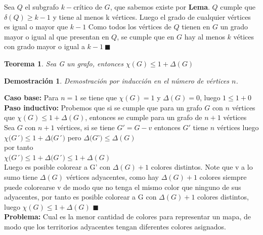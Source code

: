 \documentclass[a4paper,1pt]{report}
\newtheorem*{teo}{Teorema}
\newtheorem*{dem}{Demostración}
\begin{document}
Sea $Q$ el subgrafo $k-$cr\'itico de $G$, que sabemos existe por \textbf{Lema}. $Q$ cumple que $\delta(Q)\geq k-1$ y tiene al menos k vértices. Luego el grado de cualquier vértices es igual o mayor que $k-1$
Como todos los v\'ertices de $Q$ tienen en $G$ un grado mayor o igual al que presentan en $Q$, se cumple que en $G$ hay al menos $k$ v\'etices con grado mayor o igual a $k-1 \ \blacksquare$

\begin{teo}
 Sea G un grafo, entonces $\chi(G)\leq 1 + \Delta(G)$
\end{teo}

\begin{dem}
Demostración por inducción en el número de vértices $n$. 
\end{dem}

\textbf{Caso base:} Para $n=1$ se tiene que $\chi(G)=1$ y $\Delta(G)=0$, luego $1\leq1+0$\\

\textbf{Paso inductivo:} Probemos que si se cumple que para un grafo $G$ con  $n$ v\'ertices que $\chi(G) \leq 1 + \Delta(G)$, entonces se cumple para un grafo de $n+1$ v\'ertices\\

Sea $G$ con $n+1$ vértices, si se tiene $G'=G-v$ entonces $G'$ tiene $n$ vértices luego
$\chi(G$´$)\leq 1 + \Delta(G$´$)$ pero $\Delta(G$'$)\leq \Delta(G)$\\ 
por tanto\\
$\chi(G$´$)\leq 1 + \Delta(G$´$)\leq 1 + \Delta(G) \  $\\

Luego es posible colorear a G' con $\Delta(G)+1$ colores distintos. Note que v a lo sumo tiene $\Delta(G)$ vértices adyacentes, como hay $\Delta(G)+1$ colores siempre puede colorearse v de modo que no tenga el mismo color que ninguno de sus adyacentes, por tanto es posible colorear a G con $\Delta(G)+1$ colores distintos, luego $\chi(G)\leq 1 + \Delta(G)$ $\blacksquare$\\


\textbf{Problema:} Cual es la menor cantidad de colores para representar un mapa, de modo que los territorios adyacentes tengan diferentes colores asignados.
\end{document}
